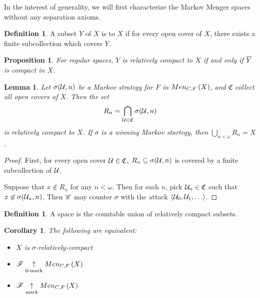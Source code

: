 \documentclass{amsart}
\newtheorem{proposition}[theorem]{Proposition}
\newtheorem{lemma}[theorem]{Lemma}
\newtheorem{corollary}[theorem]{Corollary}
\theoremstyle{definition}
\newtheorem{definition}[theorem]{Definition}
\begin{document}
In the interest of generality, we will first characterize the Markov Menger
spaces without any separation axioms.

\begin{definition}
  A subset \(Y\) of \(X\) is  to \(X\) if for every open
  cover of \(X\), there exists a finite subcollection which covers \(Y\).
\end{definition}

\begin{proposition}
  For regular spaces, \(Y\) is relatively compact to \(X\) if and only if
  \(\overline{Y}\) is compact in \(X\).
\end{proposition}

\begin{lemma}
  Let \(\sigma(\mathcal{U}, n)\) be a Markov strategy for \(F\) in
  \(Men_{C,F}\left({X}\right)\), and \(\mathfrak{C}\) collect all open covers of \(X\). Then the
  set
    \[
      R_n = \bigcap_{\mathcal{U}\in\mathfrak{C}} \sigma(\mathcal{U},n)
    \]
  is relatively compact to \(X\). If \(\sigma\) is a winning
  Markov startegy, then \(\bigcup_{n<\omega} R_n = X\).
\end{lemma}

\begin{proof}
  First, for every open cover \(\mathcal{U}\in\mathfrak C\),
  \(R_n\subseteq\sigma(\mathcal{U},n)\) is covered by a finite subcollection of \(\mathcal{U}\).

  Suppose that \(x \not\in R_n\) for any \(n<\omega\). Then for each \(n\),
  pick \(\mathcal{U}_n\in\mathfrak{C}\) such that \(x\not\in \sigma(\mathcal{U}_n,n)\). Then
  \(\mathscr{C}\) may counter \(\sigma\) with the attack \(\<\mc U_0,\mc U_1,\dots\>\).
\end{proof}

\begin{definition}
  A  space is the countable union of
  relatively compact subsets.
\end{definition}

\begin{corollary}
  The following are equivalent:
  \begin{itemize}
    \item \(X\) is \(\sigma\)-relatively-compact
    \item \(\mathscr{F} \underset{0\text{-mark}}{\uparrow} Men_{C,F}\left({X}\right)\)
    \item \(\mathscr{F} \underset{\text{mark}}{\uparrow} Men_{C,F}\left({X}\right)\)
  \end{itemize}
\end{corollary}
\end{document}
